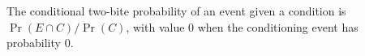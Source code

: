 \begin{definition}
The conditional two-bite probability of an event given a condition is
\(\Pr(E\cap C)/\Pr(C)\), with value \(0\) when the conditioning event has
probability \(0\).
\end{definition}
